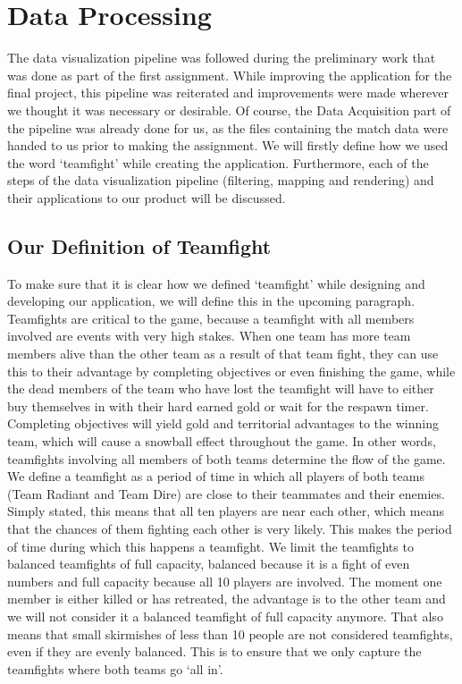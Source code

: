 \documentclass[11pt,twoside,a4paper]{article}
\begin{document}
\section{Data Processing}
\label{sec:dataproc}
The data visualization pipeline was followed during the preliminary work that was done as part of the first assignment. While improving the application for the final project, this pipeline was reiterated and improvements were made wherever we thought it was necessary or desirable. Of course, the Data Acquisition part of the pipeline was already done for us, as the files containing the match data were handed to us prior to making the assignment. We will firstly define how we used the word `teamfight' while creating the application. Furthermore, each of the steps of the data visualization pipeline (filtering, mapping and rendering) and their applications to our product will be discussed.

\subsection{Our Definition of Teamfight}
To make sure that it is clear how we defined `teamfight' while designing and developing our application, we will define this in the upcoming paragraph. Teamfights are critical to the game, because a teamfight with all members involved are events with very high stakes. When one team has more team members alive than the other team as a result of that team fight, they can use this to their advantage by completing objectives or even finishing the game, while the dead members of the team who have lost the teamfight will have to either buy themselves in with their hard earned gold or wait for the respawn timer. Completing objectives will yield gold and territorial advantages to the winning team, which will cause a snowball effect throughout the game. In other words, teamfights involving all members of both teams determine the flow of the game.
\newline\newline
We define a teamfight as a period of time in which all players of both teams (Team Radiant and Team Dire) are close to their teammates and their enemies. Simply stated, this means that all ten players are near each other, which means that the chances of them fighting each other is very likely. This makes the period of time during which this happens a teamfight. We limit the teamfights to balanced teamfights of full capacity, balanced because it is a fight of even numbers and full capacity because all 10 players are involved. The moment one member is either killed or has retreated, the advantage is to the other team and we will not consider it a balanced teamfight of full capacity anymore. That also means that small skirmishes of less than 10 people are not considered teamfights, even if they are evenly balanced. This is to ensure that we only capture the teamfights where both teams go `all in'.
\end{document}
